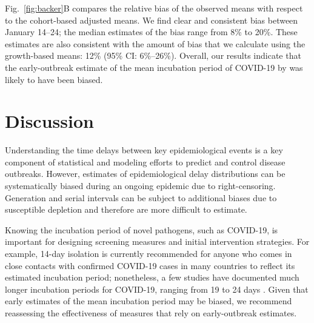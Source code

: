 \documentclass[12pt]{article}
\newcommand{\fref}[1]{Fig.~\ref{fig:#1}}
\begin{document}
\fref{backer}B compares the relative bias of the observed means with respect to the cohort-based adjusted means.
We find clear and consistent bias between January 14--24;
the median estimates of the bias range from 8\% to 20\%.
These estimates are also consistent with the amount of bias that we calculate using the growth-based means: 12\% (95\% CI: 6\%--26\%).
Overall, our results indicate that the early-outbreak estimate of the mean incubation period of COVID-19 by \cite{backer2020incubation} was likely to have been biased.


\section{Discussion}

Understanding the time delays between key epidemiological events is a key component of statistical and modeling efforts to predict and control disease outbreaks.
However, estimates of epidemiological delay distributions can be systematically biased during an ongoing epidemic due to right-censoring.
Generation and serial intervals can be subject to additional biases due to susceptible depletion and therefore are more difficult to estimate.

Knowing the incubation period of novel pathogens, such as COVID-19, is important for designing screening measures and initial intervention strategies.
For example, 14-day isolation is currently recommended for anyone who comes in close contacts with confirmed COVID-19 cases in many countries to reflect its estimated incubation period;
nonetheless, a few studies have documented much longer incubation periods for COVID-19, ranging from 19 to 24 days \citep{bai2020presumed, guan2020clinical}.
Given that early estimates of the mean incubation period may be biased,
we recommend reassessing the effectiveness of measures that rely on early-outbreak estimates.
\end{document}
